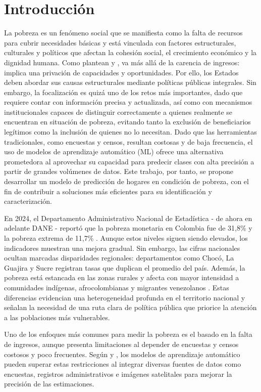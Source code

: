 \section{Introducción}

La pobreza es un fenómeno social que se manifiesta como la falta de recursos para cubrir necesidades básicas y está vinculada con factores estructurales, culturales y políticos que afectan la cohesión social, el crecimiento económico y la dignidad humana. Como plantean \cite{sen1999} y \cite{townsend1979}, va más allá de la carencia de ingresos: implica una privación de capacidades y oportunidades. Por ello, los Estados deben abordar sus causas estructurales mediante políticas públicas integrales. Sin embargo, la focalización es quizá uno de los retos más importantes, dado que requiere contar con información precisa y actualizada, así como con mecanismos institucionales capaces de distinguir correctamente a quienes realmente se encuentran en situación de pobreza, evitando tanto la exclusión de beneficiarios legítimos como la inclusión de quienes no lo necesitan. Dado que las herramientas tradicionales, como encuestas y censos, resultan costosas y de baja frecuencia, el uso de modelos de aprendizaje automático (ML) ofrece una alternativa prometedora al aprovechar su capacidad para predecir clases con alta precisión a partir de grandes volúmenes de datos. Este trabajo, por tanto, se propone desarrollar un modelo de predicción de hogares en condición de pobreza, con el fin de contribuir a soluciones más eficientes para su identificación y caracterización.

En 2024, el Departamento Administrativo Nacional de Estadística - de ahora en adelante DANE - reportó que la pobreza monetaria en Colombia fue de 31,8\% y la pobreza extrema de 11,7\% \cite{DANE2025PobrezaMonetaria}. Aunque estos niveles siguen siendo elevados, los indicadores muestran una mejora gradual. Sin embargo, las cifras nacionales ocultan marcadas disparidades regionales: departamentos como Chocó, La Guajira y Sucre registran tasas que duplican el promedio del país. Además, la pobreza está estancada en las zonas rurales y afecta con mayor intensidad a comunidades indígenas, afrocolombianas y migrantes venezolanos \cite{WorldBank2022ColombiaPoverty}. Estas diferencias evidencian una heterogeneidad profunda en el territorio nacional y señalan la necesidad de una ruta clara de política pública que priorice la atención a las poblaciones más vulnerables.

Uno de los enfoques más comunes para medir la pobreza es el basado en la falta de ingresos, aunque presenta limitaciones al depender de encuestas y censos costosos y poco frecuentes. Según \cite{SosaEscuderoAnauatiBrau2022} y \cite{Jean2016}, los modelos de aprendizaje automático pueden superar estas restricciones al integrar diversas fuentes de datos como encuestas, registros administrativos e imágenes satelitales para mejorar la precisión de las estimaciones. 

